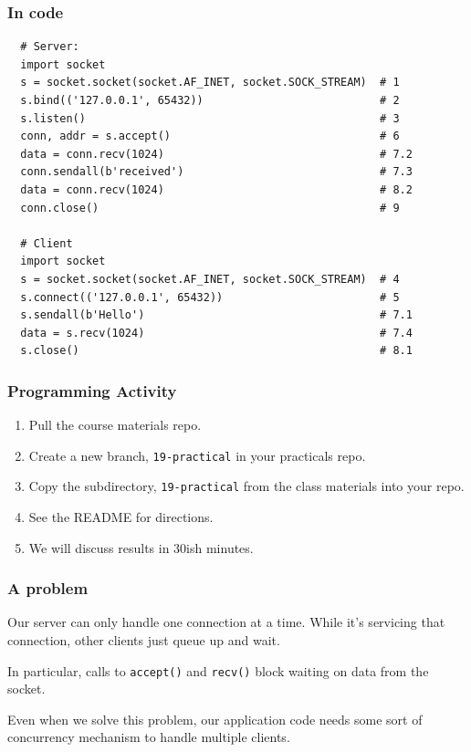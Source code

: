 \documentclass[10pt]{beamer}
\begin{document}
\begin{frame}[fragile]
  \frametitle{In code}
  
  \begin{verbatim}
  # Server:                                                                                                       
  import socket                                           
  s = socket.socket(socket.AF_INET, socket.SOCK_STREAM)  # 1
  s.bind(('127.0.0.1', 65432))                           # 2
  s.listen()                                             # 3
  conn, addr = s.accept()                                # 6
  data = conn.recv(1024)                                 # 7.2
  conn.sendall(b'received')                              # 7.3
  data = conn.recv(1024)                                 # 8.2
  conn.close()                                           # 9
  
  # Client 
  import socket
  s = socket.socket(socket.AF_INET, socket.SOCK_STREAM)  # 4
  s.connect(('127.0.0.1', 65432))                        # 5
  s.sendall(b'Hello')                                    # 7.1
  data = s.recv(1024)                                    # 7.4
  s.close()                                              # 8.1
  \end{verbatim} 
   
\end{frame}
\begin{frame}
  \frametitle{Programming Activity}
  
  \begin{enumerate}
    \item Pull the course materials repo.
    \item Create a new branch, \texttt{19-practical} in your practicals repo.
    \item Copy the subdirectory, \texttt{19-practical} from the class materials into your repo.
    \item See the README for directions.
    \item We will discuss results in 30ish minutes.
  \end{enumerate}      
\end{frame}
  
\begin{frame}
  \frametitle{A problem}
  
  Our server can only handle one connection at a time. While it's servicing that
  connection, other clients just queue up and wait. 
  
  \vspace{5mm}
  In particular, calls to \texttt{accept()} and \texttt{recv()} block waiting on 
  data from the socket.
  
  \vspace{5mm}
  Even when we solve this problem, our application code needs some sort of
  concurrency mechanism to handle multiple clients. 
    
\end{frame}
\end{document}
